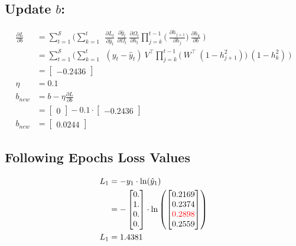 \documentclass{article}
\begin{document}
\subsection{Update $b$:}
\begin{align*}
     \frac{\partial L}{ \partial{b}} &= \sum_{t=1}^{\mathcal{S}} 
	\bigg(	
	 \sum_{k=1}^{t} ~
	~\frac{\partial L_t}{\partial \hat{y}_t}
        ~\frac{\partial \hat{y}_t}{\partial \Omega_t}
	~\frac{\partial \Omega_t}{\partial h_t}
        \prod_{j=k}^{t-1} \bigg(
	~\frac{\partial h_{j+1}}{\partial h_{j}}
        \bigg)
	~\frac{\partial h_k}{\partial b}~
	\bigg) \\
  &= \sum_{t=1}^{\mathcal{S}} 
	\bigg(	
	 \sum_{k=1}^{t} ~
	~(y_t - \hat{y}_t)
	~V^\top
        \prod_{j=k}^{t-1} \bigg(
	~W^\top ~ (1 - h_{j+1}^2)
        \bigg)
	~(1-h_k^2)~
	\bigg) \\
 &=\begin{bmatrix}
-0.2436
\end{bmatrix} \\
\eta &= 0.1\\
b_{new} &= b - \eta \frac{\partial L}{\partial b}\\
 &= \begin{bmatrix}
0
\end{bmatrix}- 0.1 \cdot \begin{bmatrix}
-0.2436 \end{bmatrix} \\
b_{new} &= \begin{bmatrix}
0.0244
\end{bmatrix}
\end{align*}
\subsection{Following Epochs Loss Values}

\begin{align*}
    L_1 &= -y_1 \cdot \ln(\hat{y}_1) \\
    &= -\begin{bmatrix} 0. \\ 1. \\ 0. \\ 0. \end{bmatrix} \cdot \ln\left(\begin{bmatrix} 0.2169 \\ 0.2374 \\ \textcolor{red}{0.2898} \\ 0.2559 \end{bmatrix}\right) \\
    L_1 &= 1.4381
\end{align*}
\end{document}
